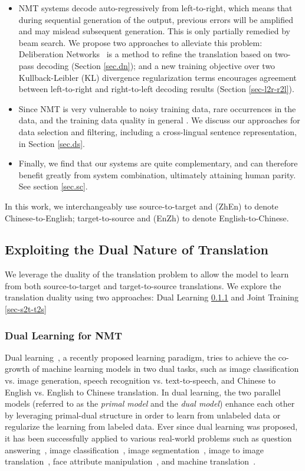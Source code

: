 \documentclass[a4paper]{article}
\begin{document}
\begin{CJK*}{UTF8}{gbsn}
\begin{itemize}
\item NMT systems decode auto-regressively from left-to-right, which means that during sequential generation of the output, previous errors will be amplified and may mislead subsequent generation. This is only partially remedied by beam search. We propose two approaches to alleviate this problem: Deliberation Networks~\cite{delibnet} is a method to refine the translation based on two-pass decoding (Section \ref{sec.dn}); and a new training objective over two Kullback-Leibler (KL) divergence regularization terms encourages agreement between left-to-right and right-to-left decoding results (Section \ref{sec-l2r-r2l}). 

\item Since NMT is very vulnerable to noisy training data, rare occurrences in the data, and the training data quality in general \cite{noisyNMT}. We discuss our approaches for data selection and filtering, including a cross-lingual sentence representation, in Section \ref{sec.ds}. 

\item Finally, we find that our systems are quite complementary, and can therefore benefit greatly from system combination, ultimately attaining human parity. See section \ref{sec.sc}.
\end{itemize}

In this work, we interchangeably use source-to-target and (ZhEn) to denote Chinese-to-English; target-to-source and (EnZh) to denote English-to-Chinese. \subsection{Exploiting the Dual Nature of Translation}
\label{sec.duality}
We leverage  the duality of the translation problem to allow the model to learn from both source-to-target and target-to-source translations. We explore the translation duality using two approaches: Dual Learning \ref{sec.dl} and Joint Training \ref{sec-s2t-t2s}
\subsubsection{Dual Learning for NMT}
\label{sec.dl}
Dual learning~\cite{dualNMT,DSL,dualInfer}, a recently proposed learning paradigm, tries to achieve the co-growth of machine learning models in two dual tasks, such as image classification vs. image generation, speech recognition vs. text-to-speech, and Chinese to English vs. English to Chinese translation. In dual learning, the two parallel models (referred to as the \emph{primal model} and the \emph{dual model}) enhance each other by leveraging primal-dual structure in order to learn from unlabeled data or regularize the learning from labeled data. Ever since dual learning was proposed, it has been successfully applied to various real-world problems such as question answering~\cite{tang2017question}, image classification~\cite{DSL}, image segmentation~\cite{deepdual}, image to image translation~\cite{dualgan,cyclegan,cdgan}, face attribute manipulation~\cite{face}, and machine translation~\cite{dualNMT,wang2018dt,unsupervisedNMT,artetxe2018unsupervised}.


\end{CJK*}
\end{document}
